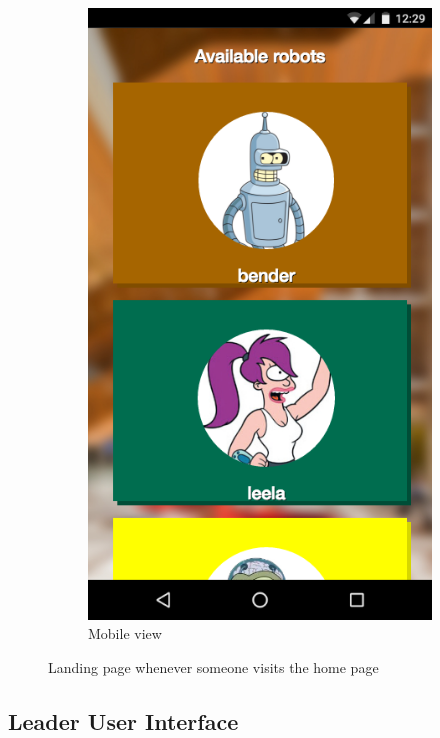 \documentclass[
  oneside,
  11pt, a4paper,
  footinclude=true,
  headinclude=true,
  cleardoublepage=empty
]{article}
\begin{document}
\begin{figure}[!tbp]
\begin{subfigure}[b]{0.25\textwidth}
    \includegraphics[width=\textwidth]{mobile_homepage}
    \caption{Mobile view}
  \end{subfigure}
  \caption{Landing page whenever someone visits the home page}
  \label{fig:homepage}
\end{figure}

\subsection{Leader User Interface}
\end{document}
